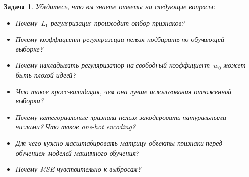 \documentclass[12pt,fleqn]{article}
\newtheorem{esProblem}{Задача}
\begin{document}
\begin{esProblem}
    Убедитесь, что вы знаете ответы на следующие вопросы:
    \begin{itemize}
        \item Почему~$L_1$-регуляризация производит отбор признаков?
        \item Почему коэффициент регуляризации нельзя подбирать по обучающей выборке?
        \item Почему накладывать регуляризатор на свободный коэффициент~$w_0$ может быть плохой идеей?
        \item Что такое кросс-валидация, чем она лучше использования отложенной выборки?
        \item Почему категориальные признаки нельзя закодировать натуральными числами? Что такое one-hot encoding?
        \item Для чего нужно масштабировать матрицу объекты-признаки перед обучением моделей машинного обучения?
        \item Почему MSE чувствительно к выбросам?
    \end{itemize}
\end{esProblem}
\end{document}
